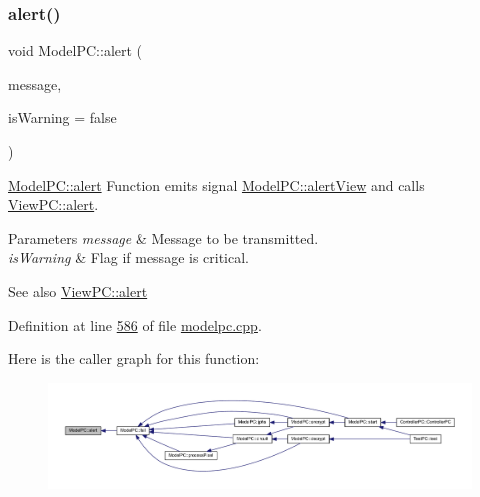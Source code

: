 \subsubsection{\texorpdfstring{alert()}{alert()}}
{\footnotesize\ttfamily void Model\+P\+C\+::alert (\begin{DoxyParamCaption}\item[{Q\+String}]{message,  }\item[{bool}]{is\+Warning = {\ttfamily false} }\end{DoxyParamCaption})}



\mbox{\hyperlink{class_model_p_c_a9079a101d83672aa48fd2dbac797de40}{Model\+P\+C\+::alert}} Function emits signal \mbox{\hyperlink{class_model_p_c_aef1f058227af54e4cfc9fc4c4397d30c}{Model\+P\+C\+::alert\+View}} and calls \mbox{\hyperlink{class_view_p_c_a7c467169467789561078abc9d4fe57bd}{View\+P\+C\+::alert}}. 


\begin{DoxyParams}{Parameters}
{\em message} & Message to be transmitted. \\
\hline
{\em is\+Warning} & Flag if message is critical. \\
\hline
\end{DoxyParams}
\begin{DoxySeeAlso}{See also}
\mbox{\hyperlink{class_view_p_c_a7c467169467789561078abc9d4fe57bd}{View\+P\+C\+::alert}} 
\end{DoxySeeAlso}


Definition at line \mbox{\hyperlink{modelpc_8cpp_source_l00586}{586}} of file \mbox{\hyperlink{modelpc_8cpp_source}{modelpc.\+cpp}}.

Here is the caller graph for this function\+:
\nopagebreak
\begin{figure}[H]
\begin{center}
\leavevmode
\includegraphics[width=350pt]{class_model_p_c_a9079a101d83672aa48fd2dbac797de40_icgraph}
\end{center}
\end{figure}
\mbox{\label{class_model_p_c_aef1f058227af54e4cfc9fc4c4397d30c}} 
